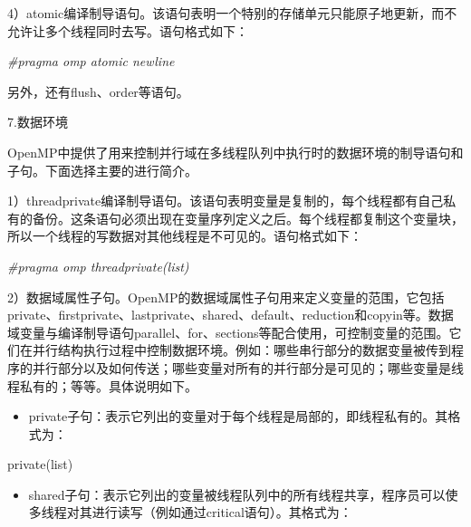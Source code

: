 \documentclass[]{ctexbook}
\newenvironment{Shaded}{\begin{snugshade}}{\end{snugshade}}
\newcommand{\NormalTok}[1]{#1}
\newcommand{\PreprocessorTok}[1]{\textcolor[rgb]{0.56,0.35,0.01}{\textit{#1}}}
\providecommand{\tightlist}{%
  \setlength{\itemsep}{0pt}\setlength{\parskip}{0pt}}
\begin{document}
4）atomic编译制导语句。该语句表明一个特别的存储单元只能原子地更新，而不允许让多个线程同时去写。语句格式如下：

\begin{Shaded}
\begin{Highlighting}[]
\PreprocessorTok{\#pragma omp atomic newline}
\end{Highlighting}
\end{Shaded}

另外，还有flush、order等语句。

7.数据环境

OpenMP中提供了用来控制并行域在多线程队列中执行时的数据环境的制导语句和子句。下面选择主要的进行简介。

1）threadprivate编译制导语句。该语句表明变量是复制的，每个线程都有自己私有的备份。这条语句必须出现在变量序列定义之后。每个线程都复制这个变量块，所以一个线程的写数据对其他线程是不可见的。语句格式如下：

\begin{Shaded}
\begin{Highlighting}[]
\PreprocessorTok{\#pragma omp threadprivate(list)}
\end{Highlighting}
\end{Shaded}

2）数据域属性子句。OpenMP的数据域属性子句用来定义变量的范围，它包括private、firstprivate、lastprivate、shared、default、reduction和copyin等。数据域变量与编译制导语句parallel、for、sections等配合使用，可控制变量的范围。它们在并行结构执行过程中控制数据环境。例如：哪些串行部分的数据变量被传到程序的并行部分以及如何传送；哪些变量对所有的并行部分是可见的；哪些变量是线程私有的；等等。具体说明如下。

\begin{itemize}
\tightlist
\item
  private子句：表示它列出的变量对于每个线程是局部的，即线程私有的。其格式为：
\end{itemize}

\begin{Shaded}
\begin{Highlighting}[]
\NormalTok{private(list) }
\end{Highlighting}
\end{Shaded}

\begin{itemize}
\tightlist
\item
  shared子句：表示它列出的变量被线程队列中的所有线程共享，程序员可以使多线程对其进行读写（例如通过critical语句）。其格式为：
\end{itemize}
\end{document}
